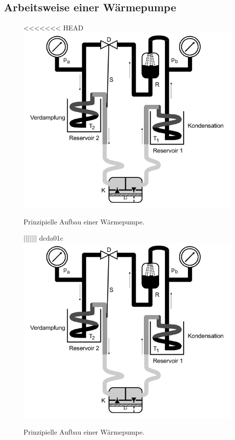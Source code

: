 \subsection{Arbeitsweise einer Wärmepumpe}
\begin{figure}
    \centering
<<<<<<< HEAD
    \includegraphics[width=\textwidth]{Aufbau_Waermepumpe.png}
    \caption{Prinzipielle Aufbau einer Wärmepumpe. \cite[3]{anleitung}}    
||||||| dcda01c
    \includegraphics[width=\textwidth]{Aufbau_Waermepumpe.png}
    \caption{Prinzipielle Aufbau einer Wärmepumpe.\cite[3]{anleitung}}    

\end{figure}
